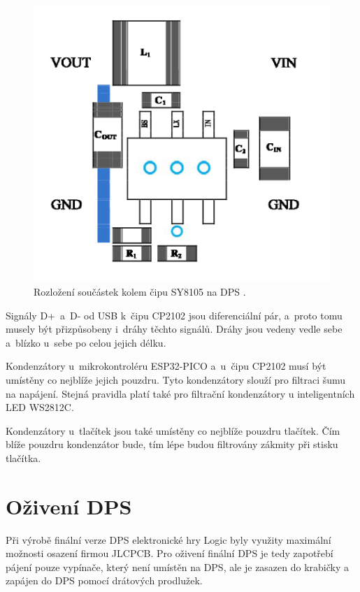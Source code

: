   \begin{figure}[!h]
    \begin{center}
      \includegraphics[scale=1]{obrazky/SY8105_rozlozeni_na_DPS.png}
    \end{center}
    \caption[Rozložení součástek kolem čipu SY8105 na DPS \cite{SY8105_datasheet}]{Rozložení součástek kolem čipu SY8105 na DPS 
    \cite{SY8105_datasheet}.}
  \end{figure}

  Signály D+~a~D- od USB k~čipu CP2102 jsou diferenciální pár, a~proto tomu musely být přizpůsobeny i~dráhy těchto signálů. Dráhy 
  jsou vedeny vedle sebe a~blízko u~sebe po celou jejich délku.

  Kondenzátory u~mikrokontroléru ESP32-PICO a~u~čipu CP2102 musí být umístěny co nejblíže jejich pouzdru. Tyto kondenzátory slouží pro 
  filtraci šumu na napájení. Stejná pravidla platí také pro filtrační kondenzátory u inteligentních LED WS2812C.

  Kondenzátory u~tlačítek jsou také umístěny co nejblíže pouzdru tlačítek. Čím blíže pouzdru kondenzátor bude, tím lépe budou 
  filtrovány zákmity při stisku tlačítka.

  \chapter{Oživení DPS}
  Při výrobě finální verze DPS elektronické hry Logic byly využity maximální možnosti osazení firmou JLCPCB.  
  Pro oživení finální DPS je tedy zapotřebí pájení pouze vypínače, který není umístěn na DPS, ale je zasazen do krabičky a zapájen
  do DPS pomocí drátových prodlužek. 

